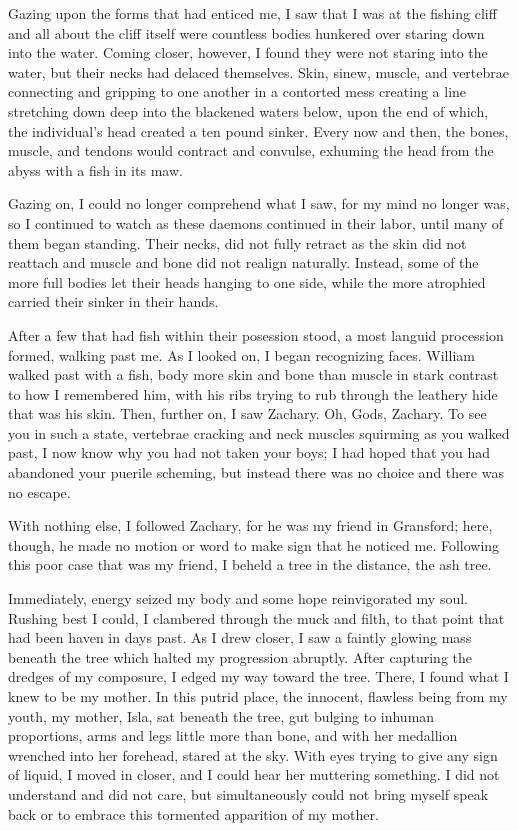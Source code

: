 \documentclass[11pt]{memoir}
\begin{document}
Gazing upon the forms that had enticed me, I saw that I was at the fishing cliff and all about the cliff itself were countless bodies hunkered over staring down into the water. Coming closer, however, I found they were not staring into the water, but their necks had delaced themselves. Skin, sinew, muscle, and vertebrae connecting and gripping to one another in a contorted mess creating a line stretching down deep into the blackened waters below, upon the end of which, the individual's head created a ten pound sinker. Every now and then, the bones, muscle, and tendons would contract and convulse, exhuming the head from the abyss with a fish in its maw.

Gazing on, I could no longer comprehend what I saw, for my mind no longer was, so I continued to watch as these daemons continued in their labor, until many of them began standing. Their necks, did not fully retract as the skin did not reattach and muscle and bone did not realign naturally. Instead, some of the more full bodies let their heads hanging to one side, while the more atrophied carried their sinker in their hands.

After a few that had fish within their posession stood, a most languid procession formed, walking past me. As I looked on, I began recognizing faces. William walked past with a fish, body more skin and bone than muscle in stark contrast to how I remembered him, with his ribs trying to rub through the leathery hide that was his skin. Then, further on, I saw Zachary. Oh, Gods, Zachary. To see you in such a state, vertebrae cracking and neck muscles squirming as you walked past, I now know why you had not taken your boys; I had hoped that you had abandoned your puerile scheming, but instead there was no choice and there was no escape.

With nothing else, I followed Zachary, for he was my friend in Gransford; here, though, he made no motion or word to make sign that he noticed me. Following this poor case that was my friend, I beheld a tree in the distance, the ash tree.

Immediately, energy seized my body and some hope reinvigorated my soul. Rushing best I could, I clambered through the muck and filth, to that point that had been haven in days past. As I drew closer, I saw a faintly glowing mass beneath the tree which halted my progression abruptly. After capturing the dredges of my composure, I edged my way toward the tree. There, I found what I knew to be my mother. In this putrid place, the innocent, flawless being from my youth, my mother, Isla, sat beneath the tree, gut bulging to inhuman proportions, arms and legs little more than bone, and with her medallion wrenched into her forehead, stared at the sky. With eyes trying to give any sign of liquid, I moved in closer, and I could hear her muttering something. I did not understand and did not care, but simultaneously could not bring myself speak back or to embrace this tormented apparition of my mother.
\end{document}
